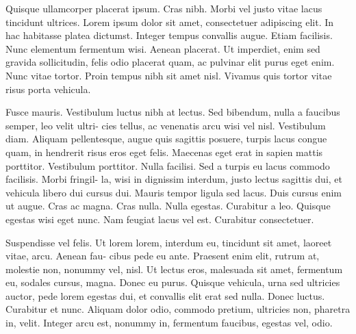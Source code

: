 \documentclass[11pt,a4paper,twoside]{article}\usepackage[]{graphicx}\usepackage[]{color}
\begin{document}
Quisque ullamcorper placerat ipsum. Cras nibh. Morbi vel justo vitae
lacus tincidunt ultrices. Lorem ipsum dolor sit amet, consectetuer
adipiscing elit. In hac habitasse platea dictumst. Integer tempus
convallis augue. Etiam facilisis. Nunc elementum fermentum wisi. Aenean
placerat. Ut imperdiet, enim sed gravida sollicitudin, felis odio
placerat quam, ac pulvinar elit purus eget enim. Nunc vitae tortor.
Proin tempus nibh sit amet nisl. Vivamus quis tortor vitae risus porta
vehicula. 

Fusce mauris. Vestibulum luctus nibh at lectus. Sed bibendum, nulla
a faucibus semper, leo velit ultri- cies tellus, ac venenatis arcu
wisi vel nisl. Vestibulum diam. Aliquam pellentesque, augue quis sagittis
posuere, turpis lacus congue quam, in hendrerit risus eros eget felis.
Maecenas eget erat in sapien mattis porttitor. Vestibulum porttitor.
Nulla facilisi. Sed a turpis eu lacus commodo facilisis. Morbi fringil-
la, wisi in dignissim interdum, justo lectus sagittis dui, et vehicula
libero dui cursus dui. Mauris tempor ligula sed lacus. Duis cursus
enim ut augue. Cras ac magna. Cras nulla. Nulla egestas. Curabitur
a leo. Quisque egestas wisi eget nunc. Nam feugiat lacus vel est.
Curabitur consectetuer.

Suspendisse vel felis. Ut lorem lorem, interdum eu, tincidunt sit
amet, laoreet vitae, arcu. Aenean fau- cibus pede eu ante. Praesent
enim elit, rutrum at, molestie non, nonummy vel, nisl. Ut lectus eros,
malesuada sit amet, fermentum eu, sodales cursus, magna. Donec eu
purus. Quisque vehicula, urna sed ultricies auctor, pede lorem egestas
dui, et convallis elit erat sed nulla. Donec luctus. Curabitur et
nunc. Aliquam dolor odio, commodo pretium, ultricies non, pharetra
in, velit. Integer arcu est, nonummy in, fermentum faucibus, egestas
vel, odio. 
\end{document}

